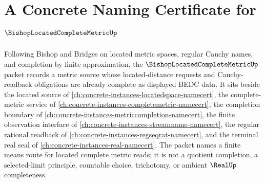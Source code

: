 \chapter{A Concrete Naming Certificate for $\BishopLocatedCompleteMetricUp$}
\label{ch:concrete-instances-bishop-located-complete-metric-namecert}

Following Bishop and Bridges on located metric spaces, regular Cauchy names, and completion by finite approximation, the $\BishopLocatedCompleteMetricUp$ packet records a metric source whose located-distance requests and Cauchy-readback obligations are already complete as displayed BEDC data. It sits beside the located source of \autoref{ch:concrete-instances-locatedspace-namecert}, the complete-metric service of \autoref{ch:concrete-instances-completemetric-namecert}, the completion boundary of \autoref{ch:concrete-instances-metriccompletion-namecert}, the finite observation interface of \autoref{ch:concrete-instances-streamname-namecert}, the regular rational readback of \autoref{ch:concrete-instances-regseqrat-namecert}, and the terminal real seal of \autoref{ch:concrete-instances-real-namecert}. The packet names a finite means route for located complete metric reads; it is not a quotient completion, a selected-limit principle, countable choice, trichotomy, or ambient $\RealUp$ completeness.

